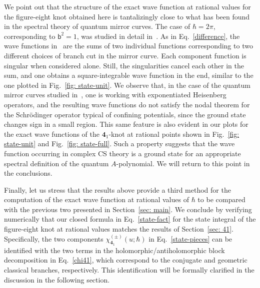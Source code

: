 \documentclass[a4paper,11pt]{article}
\theoremstyle{definition}
\def\FE{\bm{4}_1}
\newcommand{\mb}{{\mathsf{b}}}
\begin{document}
We point out that the structure of the exact wave function at rational values for the figure-eight knot obtained here is tantalizingly close to what has been found in the spectral theory of quantum mirror curves. The case of $\hbar=2 \pi$, corresponding to $\mb^2=1$, was studied in detail in~\cite{mz-wv,mz-wv2}. As in Eq.~\eqref{difference}, the wave functions in~\cite{mz-wv,mz-wv2} are the sums of two individual functions corresponding to two different choices of branch cut in the mirror curve. Each component function is singular when considered alone. Still, the singularities cancel each other in the sum, and one obtains a square-integrable wave function in the end, similar to the one plotted in Fig.~\ref{fig: state-unit}. We observe that, in the case of the quantum mirror curves studied in~\cite{mz-wv,mz-wv2}, one is working with exponentiated Heisenberg operators, and the resulting wave functions do not satisfy the nodal theorem for the Schr\"odinger operator typical of confining potentials, since the ground state changes sign in a small region. This same feature is also evident in our plots for the exact wave functions of the $\FE$-knot at rational points shown in Fig.~\ref{fig: state-unit} and Fig.~\ref{fig: state-full}. Such a property suggests that the wave function occurring in complex CS theory is a ground state for an appropriate spectral definition of the quantum $A$-polynomial. We will return to this point in the conclusions. 

Finally, let us stress that the results above provide a third method for the computation of the exact wave function at rational values of $\hbar$ to be compared with the previous two presented in Section~\ref{sec: main}. We conclude by verifying numerically that our closed formula in Eq.~\eqref{state-fact} for the state integral of the figure-eight knot at rational values matches the results of Section~\ref{sec: 41}. Specifically, the two components $\chi_{\FE}^{(\pm)}(u;\hbar) $ in Eq.~\eqref{state-pieces} can be identified with the two terms in the holomorphic/antiholomorphic block decomposition in Eq.~\eqref{chi41}, which correspond to the conjugate and geometric classical branches, respectively. This identification will be formally clarified in the discussion in the following section.
\end{document}
